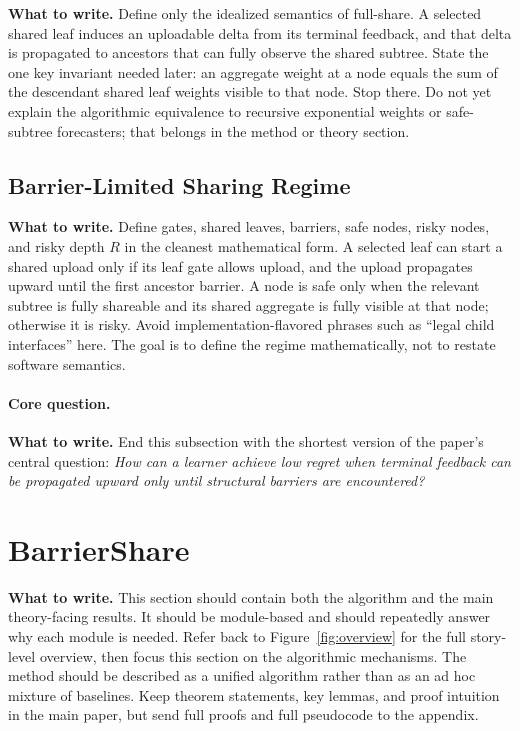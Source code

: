 \documentclass{article}
\newcommand{\towrite}[1]{\noindent\textbf{What to write.} #1}
\begin{document}
\towrite{Define only the idealized semantics of full-share. A selected shared leaf induces an uploadable delta from its terminal feedback, and that delta is propagated to ancestors that can fully observe the shared subtree. State the one key invariant needed later: an aggregate weight at a node equals the sum of the descendant shared leaf weights visible to that node. Stop there. Do not yet explain the algorithmic equivalence to recursive exponential weights or safe-subtree forecasters; that belongs in the method or theory section.}

\subsection{Barrier-Limited Sharing Regime}

\towrite{Define gates, shared leaves, barriers, safe nodes, risky nodes, and risky depth $R$ in the cleanest mathematical form. A selected leaf can start a shared upload only if its leaf gate allows upload, and the upload propagates upward until the first ancestor barrier. A node is safe only when the relevant subtree is fully shareable and its shared aggregate is fully visible at that node; otherwise it is risky. Avoid implementation-flavored phrases such as ``legal child interfaces'' here. The goal is to define the regime mathematically, not to restate software semantics.}

\paragraph{Core question.}
\towrite{End this subsection with the shortest version of the paper's central question: \emph{How can a learner achieve low regret when terminal feedback can be propagated upward only until structural barriers are encountered?}}

\section{BarrierShare}

\towrite{This section should contain both the algorithm and the main theory-facing results. It should be module-based and should repeatedly answer why each module is needed. Refer back to Figure~\ref{fig:overview} for the full story-level overview, then focus this section on the algorithmic mechanisms. The method should be described as a unified algorithm rather than as an ad hoc mixture of baselines. Keep theorem statements, key lemmas, and proof intuition in the main paper, but send full proofs and full pseudocode to the appendix.}
\end{document}
